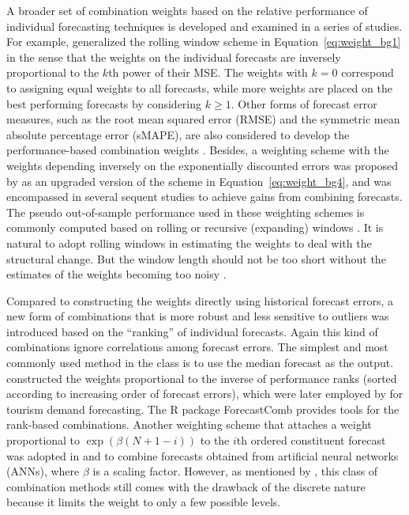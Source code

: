 \documentclass[11pt]{article}
\newcommand{\pkg}[1]{{\normalfont\fontseries{b}\selectfont #1}}
\begin{document}
A broader set of combination weights based on the relative performance of individual forecasting techniques is developed and examined in a series of studies. For example, \citet{Stock1998-np} generalized the rolling window scheme in Equation~\eqref{eq:weight_bg1} in the sense that the weights on the individual forecasts are inversely proportional to the $k$th power of their MSE. The weights with $k = 0$ correspond to assigning equal weights to all forecasts, while more weights are placed on the best performing forecasts by considering $k \geq 1$. Other forms of forecast error measures, such as the root mean squared error (RMSE) and the symmetric mean absolute percentage error (sMAPE), are also considered to develop the performance-based combination weights \citep[e.g.,][]{Nowotarski2014-ev,Pawlikowski2020-hm}. Besides, a weighting scheme with the weights depending inversely on the exponentially discounted errors was proposed by \citet{Stock2004-rq} as an upgraded version of the scheme in Equation~\eqref{eq:weight_bg4}, and was encompassed in several sequent studies \citep[e.g.,][]{Clark2010-jx,Genre2013-ut} to achieve gains from combining forecasts. The pseudo out-of-sample performance used in these weighting schemes is commonly computed based on rolling or recursive (expanding) windows \citep[e.g.,][]{Stock1998-np,Clark2010-jx,Genre2013-ut}. It is natural to adopt rolling windows in estimating the weights to deal with the structural change. But the window length should not be too short without the estimates of the weights becoming too noisy \citep{Baumeister2015-ft}.

Compared to constructing the weights directly using historical forecast errors, a new form of combinations that is more robust and less sensitive to outliers was introduced based on the ``ranking'' of individual forecasts. Again this kind of combinations ignore correlations among forecast errors. The simplest and most commonly used method in the class is to use the median forecast as the output. \citet{Aiolfi2006-rh} constructed the weights proportional to the inverse of performance ranks (sorted according to increasing order of forecast errors), which were later employed by \citet{Andrawis2011-kb} for tourism demand forecasting. The R package \pkg{ForecastComb} provides tools for the rank-based combinations. Another weighting scheme that attaches a weight proportional to $\exp(\beta(N+1-i))$ to the $i$th ordered constituent forecast was adopted in \citet{Yao2008-or} and \citet{Donate2013-lq} to combine forecasts obtained from artificial neural networks (ANNs), where $\beta$ is a scaling factor. However, as mentioned by \citet{Andrawis2011-kb}, this class of combination methods still comes with the drawback of the discrete nature because it limits the weight to only a few possible levels.
\end{document}
